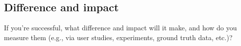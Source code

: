 \subsection{Difference and impact}
If you're successful, what difference and impact will it make, and how do you measure them (e.g., via user studies, experiments, ground truth data, etc.)?
